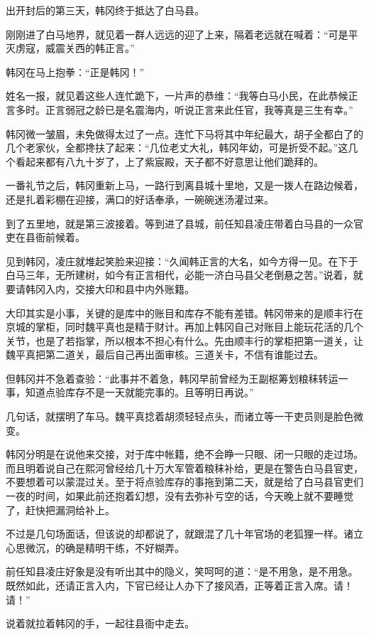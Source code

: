 出开封后的第三天，韩冈终于抵达了白马县。

刚刚进了白马地界，就见着一群人远远的迎了上来，隔着老远就在喊着：“可是平灭虏寇，威震关西的韩正言。”

韩冈在马上抱拳：“正是韩冈！”

姓名一报，就见着这些人连忙跪下，一片声的恭维：“我等白马小民，在此恭候正言多时。正言弱冠之龄已是名震海内，听说正言来此任官，我等真是三生有幸。”

韩冈微一皱眉，未免做得太过了一点。连忙下马将其中年纪最大，胡子全都白了的几个老家伙，全都搀扶了起来：“几位老丈大礼，韩冈年幼，可是折受不起。”这几个看起来都有八九十岁了，上了紫宸殿，天子都不好意思让他们跪拜的。

一番礼节之后，韩冈重新上马，一路行到离县城十里地，又是一拨人在路边候着，还是扎着彩棚在迎接，满口的好话奉承，一碗碗迷汤灌过来。

到了五里地，就是第三波接着。等到进了县城，前任知县凌庄带着白马县的一众官吏在县衙前候着。

见到韩冈，凌庄就堆起笑脸来迎接：“久闻韩正言的大名，如今方得一见。在下于白马三年，无所建树，如今有正言相代，必能一济白马县父老倒悬之苦。”说着，就要请韩冈入内，交接大印和县中内外账籍。

大印其实是小事，关键的是库中的账目和库存不能有差错。韩冈带来的是顺丰行在京城的掌柜，同时魏平真也是精于财计。再加上韩冈自己对账目上能玩花活的几个关节，也是了若指掌，所以根本不担心有什么。先由顺丰行的掌柜把第一道关，让魏平真把第二道关，最后自己再出面审核。三道关卡，不信有谁能过去。

但韩冈并不急着查验：“此事并不着急，韩冈早前曾经为王副枢筹划粮秣转运一事，知道点验库存不是一天就能完事的。且等明日再说。”

几句话，就摆明了车马。魏平真捻着胡须轻轻点头，而诸立等一干吏员则是脸色微变。

韩冈分明是在说他来交接，对于库中帐籍，绝不会睁一只眼、闭一只眼的走过场。而且明着说自己在熙河曾经给几十万大军管着粮秣补给，更是在警告白马县官吏，不要想着可以蒙混过关。至于将点验库存的事拖到第二天，就是给了白马县官吏们一夜的时间，如果此前还抱着幻想，没有去弥补亏空的话，今天晚上就不要睡觉了，赶快把漏洞给补上。

不过是几句场面话，但该说的却都说了，就跟混了几十年官场的老狐狸一样。诸立心思微沉，的确是精明干练，不好糊弄。

前任知县凌庄好象是没有听出其中的隐义，笑呵呵的道：“是不用急，是不用急。既然如此，还请正言入内，下官已经让人办下了接风酒，正等着正言入席。请！请！”

说着就拉着韩冈的手，一起往县衙中走去。

